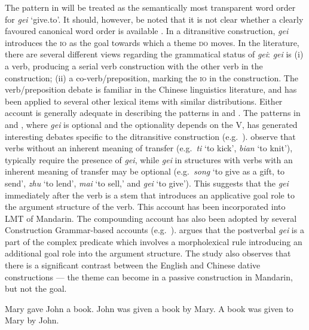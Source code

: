 \documentclass[output=paper,chinesefont,hidelinks]{langscibook}
\begin{document}
The pattern in  will be treated as the semantically most transparent word order for \textit{gei} `give.to'. It should, however, be noted that it is not clear whether a clearly favoured canonical word order is available \citep{YaoLiu2010}. In a ditransitive construction, \textit{gei} introduces the \textsc{io} as the goal towards which a theme \textsc{do} moves. In the literature, there are several different views regarding the grammatical status of \textit{gei}: \textit{gei} is (i) a verb, producing a serial verb construction with the other verb in the construction; (ii) a co-verb/preposition, marking the \textsc{io} in the construction. The verb/preposition debate is familiar in the Chinese linguistics literature, and has been applied to several other lexical items with similar distributions. Either account is generally adequate in describing the patterns in  and . The patterns in  and , where \textit{gei} is optional and the optionality depends on the V, has generated interesting debates specific to the ditransitive construction (e.g.\ \citealt{Chao1968,lithompson,ChengHuang1988}). \citet{HuangAhrens1999} observe that verbs without an inherent meaning of transfer (e.g.\ \textit{ti} `to kick', \textit{bian} `to knit'), typically require the presence of \textit{gei}, while \textit{gei} in structures with verbs with an inherent meaning of transfer may be optional (e.g.\ \textit{song} `to give as a gift, to send', \textit{zhu} `to lend', \textit{mai} `to sell,' and \textit{gei} `to give'). This suggests that the \textit{gei} immediately after the verb is a stem that introduces an applicative goal role to the argument structure of the verb. This account has been incorporated into  LMT of Mandarin. The compounding account has also been adopted by several Construction Grammar-based accounts (e.g.\ \citealt{Ahrens1995,Zhang1999,Liu2006}). \citet{Huang1993a} argues that the postverbal \textit{gei} is a part of the complex predicate which involves a morpholexical rule introducing an additional goal role into the argument structure. The study also observes that there is a significant contrast between the English and Chinese dative constructions --- the theme can become {\SUBJ} in a passive construction in Mandarin, but not the goal.

\ea%
    \label{ex:Sinitic:43}
    \ea Mary gave John a book.
    \ex John was given a book by Mary.
    \ex A book was given to Mary by John.
    \z\z
\end{document}
